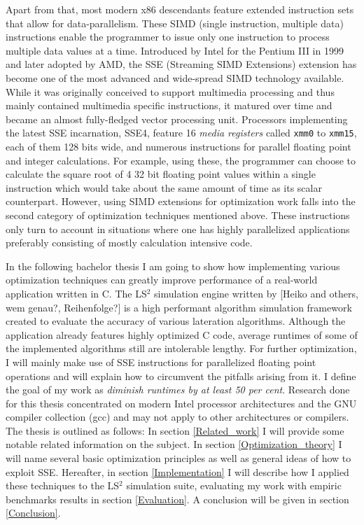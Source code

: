 Apart from that, most modern x86 descendants feature extended instruction sets that allow for data-parallelism. These SIMD (single instruction, multiple data) instructions enable the programmer to issue only one instruction to process multiple data values at a time. Introduced by Intel for the Pentium III in 1999 and later adopted by AMD, the SSE (Streaming SIMD Extensions) extension has become one of the most advanced and wide-spread SIMD technology available. While it was originally conceived to support multimedia processing and thus mainly contained multimedia specific instructions, it matured over time and became an almost fully-fledged vector processing unit. Processors implementing the latest SSE incarnation, SSE4, feature 16 \emph{media registers} called \texttt{xmm0} to \texttt{xmm15}, each of them 128 bits wide, and numerous instructions for parallel floating point and integer calculations. For example, using these, the programmer can choose to calculate the square root of 4 32 bit floating point values within a single instruction which would take about the same amount of time as its scalar counterpart. However, using SIMD extensions for optimization work falls into the second category of optimization techniques mentioned above. These instructions only turn to account in situations where one has highly parallelized applications preferably consisting of mostly calculation intensive code.

In the following bachelor thesis I am going to show how implementing various optimization techniques can greatly improve performance of a real-world application written in C. The LS$^{2}$ simulation engine written by [Heiko and others, wem genau?, Reihenfolge?] is a high performant algorithm simulation framework created to evaluate the accuracy of various lateration algorithms. Although the application already features highly optimized C code, average runtimes of some of the implemented algorithms still are intolerable lengthy. For further optimization, I will mainly make use of SSE instructions for parallelized floating point operations and will explain how to circumvent the pitfalls arising from it. I define the goal of my work as \emph{diminish runtimes by at least 50 per cent}. Research done for this thesis concentrated on modern Intel processor architectures and the GNU compiler collection (gcc) and may not apply to other architectures or compilers. The thesis is outlined as follows: In section \ref{Related_work} I will provide some notable related information on the subject. In section \ref{Optimization_theory} I will name several basic optimization principles as well as general ideas of how to exploit SSE. Hereafter, in section \ref{Implementation} I will describe how I applied these techniques to the LS$^{2}$ simulation suite, evaluating my work with empiric benchmarks results in section \ref{Evaluation}. A conclusion will be given in section \ref{Conclusion}.
